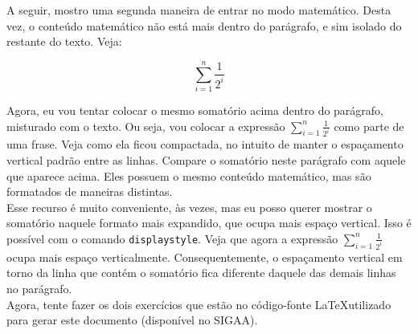 \documentclass{article}
\begin{document}
A seguir, mostro uma segunda maneira de entrar no modo matemático. Desta vez, o conteúdo matemático não está mais dentro do parágrafo, e sim isolado do restante do texto. Veja:

\[
\displaystyle \sum_{i=1}^{n} \frac{1}{2^i}
\]

Agora, eu vou tentar colocar o mesmo somatório acima dentro do parágrafo, misturado com o texto. Ou seja, vou colocar a expressão $\sum_{i=1}^{n} \frac{1}{2^i}$ como parte de uma frase. Veja como ela ficou compactada, no intuito de manter o espaçamento vertical padrão entre as linhas. Compare o somatório neste parágrafo com aquele que aparece acima. Eles possuem o mesmo conteúdo matemático, mas são formatados de maneiras distintas.\\

Esse recurso é muito conveniente, às vezes, mas eu posso querer mostrar o somatório naquele formato mais expandido, que ocupa mais espaço vertical. Isso é possível com o comando \texttt{displaystyle}. Veja que agora a expressão $\displaystyle \sum_{i=1}^{n} \frac{1}{2^i}$ ocupa mais espaço verticalmente. Consequentemente, o espaçamento vertical em torno da linha que contém o somatório fica diferente daquele das demais linhas no parágrafo.\\

Agora, tente fazer os dois exercícios que estão no código-fonte \LaTeX utilizado para gerar este documento (disponível no SIGAA).
\end{document}
